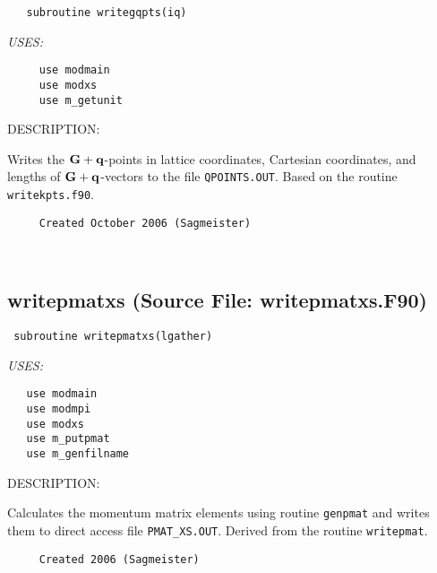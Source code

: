 \documentclass[11pt]{article}
\begin{document}
\begin{verbatim}   subroutine writegqpts(iq)\end{verbatim}{\em USES:}
\begin{verbatim}     use modmain
     use modxs
     use m_getunit\end{verbatim}
{\sf DESCRIPTION:\\ }


     Writes the ${\bf G+q}$-points in lattice coordinates, Cartesian 
     coordinates, and lengths of ${\bf G+q}$-vectors to the file 
     {\tt QPOINTS.OUT}. Based on the routine {\tt writekpts.f90}.
  
\begin{verbatim}     Created October 2006 (Sagmeister)\end{verbatim}








 
 
\mbox{}\hrulefill\ 
 
\subsection{writepmatxs (Source File: writepmatxs.F90)}


\begin{verbatim} subroutine writepmatxs(lgather)\end{verbatim}{\em USES:}
\begin{verbatim}   use modmain
   use modmpi
   use modxs
   use m_putpmat
   use m_genfilname\end{verbatim}
{\sf DESCRIPTION:\\ }


     Calculates the momentum matrix elements using routine {\tt genpmat} and
     writes them to direct access file {\tt PMAT\_XS.OUT}. Derived from
     the routine {\tt writepmat}.
  
\begin{verbatim}     Created 2006 (Sagmeister)\end{verbatim}
\end{document}
